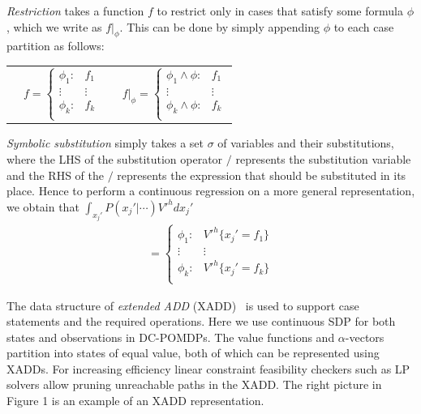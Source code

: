\documentclass{article} %
\begin{document}
\emph{Restriction} takes a function $f$ to restrict only in cases
that satisfy some formula $\phi$, which we write as $f|_{\phi}$.  
This can be done by simply appending $\phi$ to each case partition
as follows:
{\footnotesize
\begin{center}
\begin{tabular}{r c c l}
&
\hspace{-6mm} 
  $f = \begin{cases}
    \phi_1: & f_1 \\ 
   \vdots&\vdots\\ 
    \phi_k: & f_k \\ 
  \end{cases}$
&

&
\hspace{-2mm}
  $f|_{\phi} = \begin{cases}
    \phi_1 \land \phi : & f_1 \\ 
   \vdots&\vdots\\ 
    \phi_k \land \phi : & f_k \\ 
  \end{cases}$
\end{tabular}
\end{center}
}

\emph{Symbolic substitution} simply takes a set $\sigma$ of variables and their substitutions, where
the LHS of the substitution operator $/$ represents the substitution variable and the
RHS of the $/$ represents the expression that should be substituted in its place.
Hence to perform a continuous regression on a more general
representation, we obtain that $\int_{x_j'} P(x_j'|\cdots) V'^{h} dx_j'$
\begin{align*}
    = \begin{cases}
    \phi_1: & V'^{h} \{ x_j' = f_1 \} \\ 
   \vdots&\vdots\\ 
    \phi_k: & V'^{h} \{ x_j' = f_k \}  \\ 
  \end{cases}
\end{align*}


The data structure of \emph{extended ADD} (XADD)~\cite{sanner_uai11} is used to support
case statements and the required operations.  Here we use continuous SDP for both states and observations in DC-POMDPs. The value functions and $\alpha$-vectors partition into states of equal value, both of which can be represented using XADDs. For increasing efficiency linear constraint feasibility checkers such as LP solvers allow pruning unreachable paths in the XADD. The right picture in Figure 1 is an example of an XADD representation. 
\end{document}
